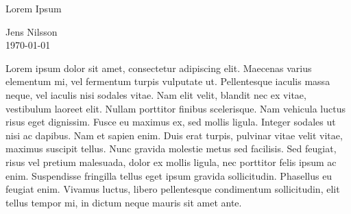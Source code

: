 \begin{titlingpage}

\vspace{5cm}
\Huge
 \begin{center}
Lorem Ipsum\\ 

\hspace{10pt}

\large
Jens Nilsson \\

\vspace{20pt}
\small{\today}

\hspace{10pt}

\end{center}

\hspace{10pt}

\normalsize
Lorem ipsum dolor sit amet, consectetur adipiscing elit. Maecenas varius elementum mi, vel fermentum turpis vulputate ut. Pellentesque iaculis massa neque, vel iaculis nisi sodales vitae. Nam elit velit, blandit nec ex vitae, vestibulum laoreet elit. Nullam porttitor finibus scelerisque. Nam vehicula luctus risus eget dignissim. Fusce eu maximus ex, sed mollis ligula. Integer sodales ut nisi ac dapibus. Nam et sapien enim. Duis erat turpis, pulvinar vitae velit vitae, maximus suscipit tellus. Nunc gravida molestie metus sed facilisis. Sed feugiat, risus vel pretium malesuada, dolor ex mollis ligula, nec porttitor felis ipsum ac enim. Suspendisse fringilla tellus eget ipsum gravida sollicitudin. Phasellus eu feugiat enim. Vivamus luctus, libero pellentesque condimentum sollicitudin, elit tellus tempor mi, in dictum neque mauris sit amet ante.

\end{titlingpage}